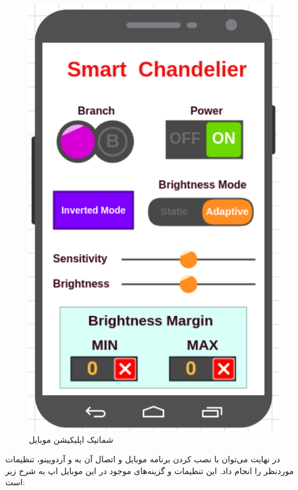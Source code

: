 \documentclass[12pt,a4paper]{article}
\begin{document}
	\begin{figure}[H]
	\centering
	\includegraphics[scale=0.5]{figs/shcema-ma.png}
	\caption{
		شماتیک اپلیکیشن موبایل
	}
	\label{fig:schema13}
\end{figure}
در نهایت می‌توان با نصب کردن برنامه موبایل و اتصال آن به  و آردویینو، تنظیمات موردنظر را انجام داد. این تنظیمات و گزینه‌های موجود در این موبایل اپ به شرح زیر است:
\end{document}
